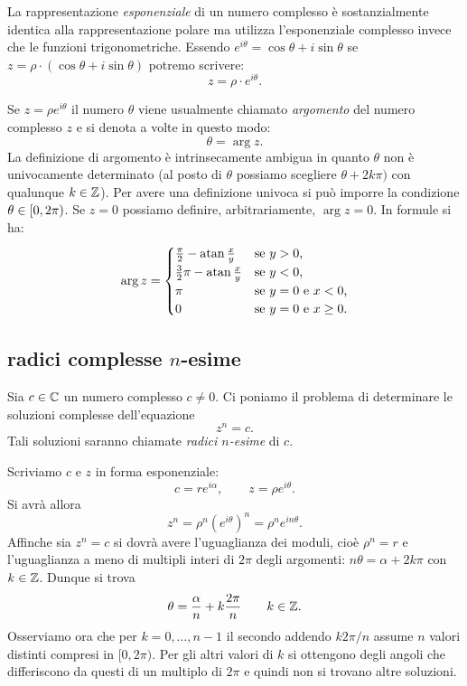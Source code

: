 La rappresentazione \emph{esponenziale} di un numero complesso 
è sostanzialmente identica alla rappresentazione polare 
ma utilizza l'esponenziale complesso invece che 
le funzioni trigonometriche. 
Essendo $e^{i\theta} = \cos \theta + i\sin \theta$
se $z=\rho\cdot (\cos \theta + i \sin \theta)$ potremo scrivere:
\[
  z = \rho \cdot e^{i\theta}.  
\]

Se $z=\rho e^{i\theta}$
il numero $\theta$ viene usualmente chiamato \emph{argomento}
del numero complesso $z$ e si denota a volte 
in questo modo:
\[
  \theta = \arg z.  
\]
La definizione di argomento è intrinsecamente ambigua 
in quanto $\theta$ non è univocamente determinato
(al posto di $\theta$ possiamo scegliere $\theta+2k\pi)$ 
con qualunque $k\in {\mathbb Z}$).
Per avere una definizione univoca si può imporre 
la condizione $\theta\in\left[0,2\pi\right)$.
Se $z=0$ possiamo definire, arbitrariamente, 
$\arg z = 0$. 
In formule si ha:
\[
  \arg z =
  \begin{cases}
   \frac \pi 2 - \operatorname{atan} \frac x y & \text{se $y>0$,} \\
   \frac 3 2 \pi- \operatorname{atan} \frac x y & \text{se $y<0$,} \\
   \pi & \text{se $y=0$ e $x<0$,} \\
   0 & \text{se $y=0$ e $x\ge 0$.}
   \end{cases}
\]

\subsection{radici complesse $n$-esime}

Sia $c\in {\mathbb C}$ un numero
complesso $c\neq 0$.
Ci poniamo il problema di determinare le soluzioni complesse
dell'equazione
\[
  z^n = c.
\]
Tali soluzioni saranno chiamate \emph{radici $n$-esime}%
%
 di $c$.

Scriviamo $c$ e $z$ in forma esponenziale:
\[
  c = r e^{i\alpha}, \qquad
  z = \rho e^{i\theta}.
\]
Si avrà allora
\[
  z^n = \rho^n (e^{i\theta})^n = \rho^n e^{i n \theta}.
\]
Affinche sia $z^n = c$ si dovrà avere l'uguaglianza dei moduli, cioè $\rho^n = r$ e l'uguaglianza a meno di multipli interi di $2\pi$ degli argomenti:
$n \theta = \alpha + 2 k \pi$ con $k\in {\mathbb Z}$.
Dunque si trova
\[
  \theta = \frac{\alpha}{n} + k\frac{2\pi}{n}
\qquad k \in {\mathbb Z}.
\]
Osserviamo ora che per $k=0,\dots, n-1$ il secondo addendo
$k 2\pi /n$ assume $n$ valori distinti compresi in $[0,2\pi)$.
Per gli altri valori di $k$ si ottengono degli angoli che differiscono
da questi di un multiplo di $2\pi$ e quindi non si trovano
altre soluzioni.


